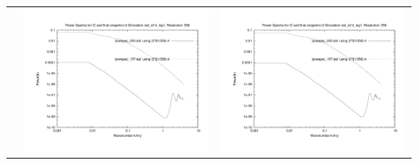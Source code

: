 \begin{itemize}
\begin{table}[p]
\begin{tabular}{l|c|c}
 & \includegraphics[scale=0.25]{r256/h70/red_st14_log1/plot_powspec_red_st14_log1.pdf} & \includegraphics[scale=0.25]{r256/h100/red_st14_log1/plot_powspec_red_st14_log1.pdf} \\

\end{tabular}
\end{table}
\end{itemize}
